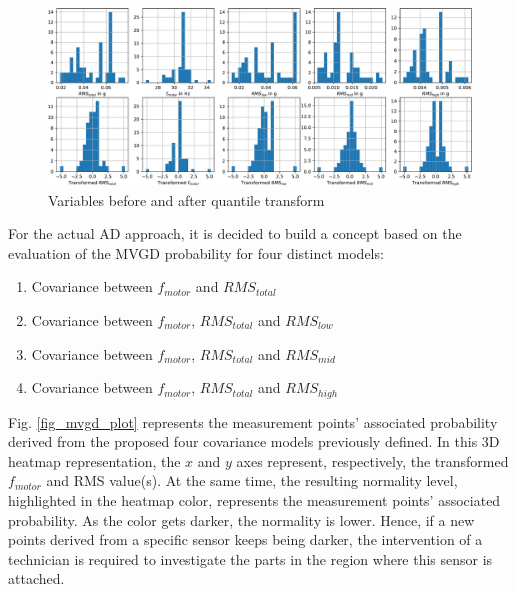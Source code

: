 \documentclass[conference]{IEEEtran}
\begin{document}

\begin{figure}[htbp]
\centerline{\includegraphics[width=\columnwidth]{graphics/quantile_transform_data/quantile_transform_data_ohne.pdf}}
\caption{Variables before and after quantile transform}
\label{fig_transform_result}
\end{figure}

For the actual AD approach, it is decided to build a concept based on the evaluation of the MVGD probability for four distinct models:

\begin{enumerate}
	\item Covariance between $f_{motor}$ and $RMS_{total}$
	\item Covariance between $f_{motor}$, $RMS_{total}$ and $RMS_{low}$
	\item Covariance between $f_{motor}$, $RMS_{total}$ and $RMS_{mid}$
	\item Covariance between $f_{motor}$, $RMS_{total}$ and $RMS_{high}$
\end{enumerate}


Fig. \ref{fig_mvgd_plot} represents the measurement points' associated probability derived from the proposed four covariance models previously defined. In this 3D heatmap representation, the $x$ and $y$ axes represent, respectively, the transformed $f_{motor}$ and RMS value(s). At the same time, the resulting normality level, highlighted in the heatmap color, represents the measurement points' associated probability. As the color gets darker, the normality is lower. Hence, if a new points  derived from a specific sensor keeps being darker, the intervention of a technician is required to investigate the parts in the region where this sensor is attached. 
\end{document}
